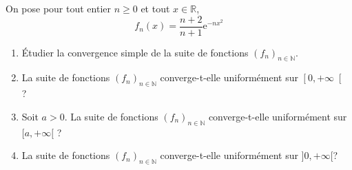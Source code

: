 \documentclass[a4paper,10pt]{report}
\begin{document}
\begin{Exercice}{} On pose pour tout entier $n \geq 0$ et tout $x \in \mathbb{R}$,
$$f_{n}(x) =\dfrac{n+2}{n+1}\mathrm{e}^{-n x^{2}}$$
\begin{enumerate}
\item \'Etudier la convergence simple de la suite de fonctions $\left(f_{n}\right) _{n\in \mathbb{N}}$.
\item     La suite de fonctions  $\left(f_{n}\right) _{n\in \mathbb{N}}$ converge-t-elle uniformément sur $\left[ 0,+\infty\right[$ ?
\item Soit $a>0$. La suite de fonctions $\left(f_{n}\right) _{n\in \mathbb{N}}$ converge-t-elle uniform\'{e}ment sur  $[a,+\infty[$ ?	
\item La suite de fonctions  $\left(f_{n}\right) _{n\in \mathbb{N}}$ converge-t-elle uniform\'{e}ment sur $]0,+\infty[$? 
\end{enumerate}
\end{Exercice}
\end{document}
